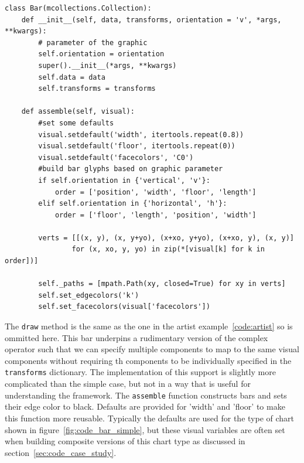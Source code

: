 \documentclass[../main.tex]{subfiles}
\begin{document}
\begin{verbatim}
class Bar(mcollections.Collection):
    def __init__(self, data, transforms, orientation = 'v', *args, **kwargs):
        # parameter of the graphic
        self.orientation = orientation 
        super().__init__(*args, **kwargs)
        self.data = data
        self.transforms = transforms
    
    def assemble(self, visual):
        #set some defaults
        visual.setdefault('width', itertools.repeat(0.8))
        visual.setdefault('floor', itertools.repeat(0))
        visual.setdefault('facecolors', 'C0')
        #build bar glyphs based on graphic parameter
        if self.orientation in {'vertical', 'v'}:
            order = ['position', 'width', 'floor', 'length']
        elif self.orientation in {'horizontal', 'h'}:
            order = ['floor', 'length', 'position', 'width']
        
        verts = [[(x, y), (x, y+yo), (x+xo, y+yo), (x+xo, y), (x, y)] 
                for (x, xo, y, yo) in zip(*[visual[k] for k in order])]

        self._paths = [mpath.Path(xy, closed=True) for xy in verts]
        self.set_edgecolors('k')
        self.set_facecolors(visual['facecolors'])

\end{verbatim}
The \texttt{draw} method is the same as the one in the artist example~\ref{code:artist} so is ommitted here.  This bar underpins a rudimentary version of the complex \plus operator such that we can specify multiple components to map to the same visual components without requiring th components to be individually specified in the \texttt{transforms} dictionary. The implementation of this support is slightly more complicated than the simple case, but not in a way that is useful for understanding the framework. The \texttt{assemble} function constructs bars and sets their edge color to black. Defaults are provided for 'width' and 'floor' to make this function more reusable. Typically the defaults are used for the type of chart shown in figure~\ref{fig:code_bar_simple}, but these visual variables are often set when building composite versions of this chart type as discussed in section~\ref{sec:code_case_study}. 
\end{document}
